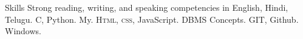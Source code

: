 
\begin{rubric}{Skills}
\entry*[Languages]
	Strong reading, writing, and speaking competencies in English, Hindi, Telugu.
	C, Python.
\entry*[Databases]
	My.
	\textsc{Html, css}, JavaScript.
	DBMS Concepts.
	GIT, Github.
	Windows.

\end{rubric}
